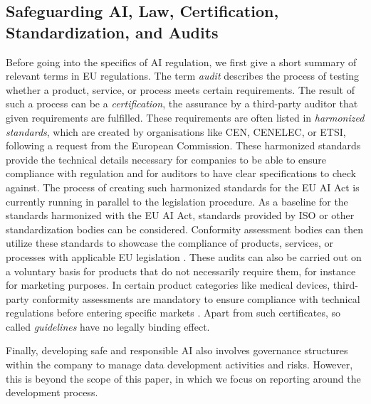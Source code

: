 \subsection{Safeguarding AI, Law, Certification, Standardization, and Audits}
Before going into the specifics of AI regulation, we first give a short summary of relevant terms in EU regulations.
The term \emph{audit} describes the process of testing whether a product, service, or process meets certain requirements.
The result of such a process can be a \emph{certification}, the assurance by a third-party auditor that given requirements are fulfilled.
These requirements are often listed in \emph{harmonized standards}, which are created by organisations like CEN, CENELEC, or ETSI, following a request from the European Commission.
These harmonized standards provide the technical details necessary for companies to be able to ensure compliance with regulation and for auditors to have clear specifications to check against.
The process of creating such harmonized standards for the EU AI Act is currently running in parallel to the legislation procedure.
As a baseline for the standards harmonized with the EU AI Act, standards provided by ISO or other standardization bodies can be considered.
Conformity assessment bodies can then utilize these standards to showcase the compliance of products, services, or processes with applicable EU legislation \citep{EU-harmonised-standard}.
These audits can also be carried out on a voluntary basis for products that do not necessarily require them, for instance for marketing purposes.
In certain product categories like medical devices, third-party conformity assessments are mandatory to ensure compliance with technical regulations before entering specific markets \citep{EU-conformity-assessment}.
Apart from such certificates, so called \emph{guidelines} have no legally binding effect.

Finally, developing safe and responsible AI also involves governance structures within the company to manage data development activities and risks. However, this is beyond the scope of this paper, in which we focus on reporting around the development process. 


